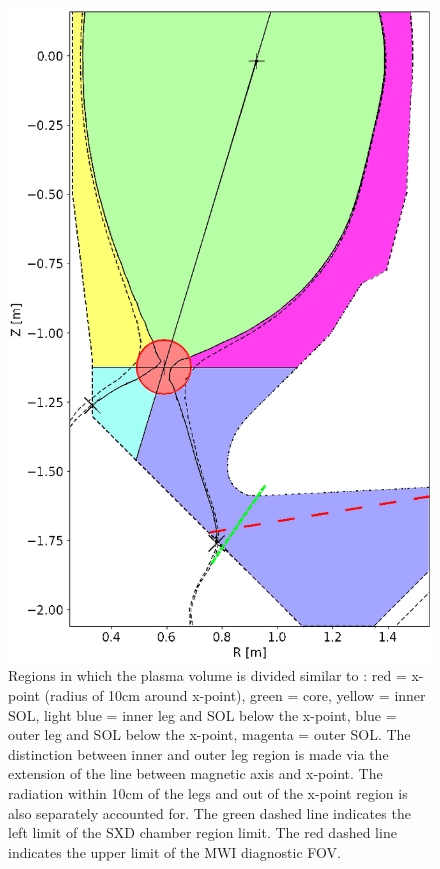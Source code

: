 \begin{figure}[!ht]
	\centering
	\includegraphics[trim={0 0 0 0},clip,width=0.4\linewidth]{Chapters/chapter2/figs/IRVB_regions_divided2.png}
	\caption{Regions in which the plasma volume is divided similar to \cite{Harrison2011}: red = x-point (radius of 10cm around x-point), green = core, yellow = inner SOL, light blue = inner leg and SOL below the x-point, blue = outer leg and SOL below the x-point, magenta = outer SOL. The distinction between inner and outer leg region is made via the extension of the line between magnetic axis and x-point. The radiation within 10cm of the legs and out of the x-point region is also separately accounted for. The green dashed line indicates the left limit of the SXD chamber region limit. The red dashed line indicates the upper limit of the MWI diagnostic FOV.}
	\label{fig:IRVB_regions_divided}
\end{figure}

